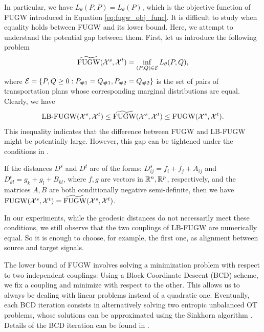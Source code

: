 In particular, we have $L_{\theta}(P, P) = L_{\theta}(P)$,
which is the objective function of FUGW introduced in Equation \eqref{eq:fugw_obj_func}.
It is difficult to study when equality holds between FUGW and its lower bound.
Here, we attempt to understand the potential gap between them.
First, let us introduce the following problem
\begin{equation}
  \widetilde{\text{FUGW}}(\mathcal X^s, \mathcal X^t) = \inf_{(P, Q) \in \mathcal E} L_{\theta}(P, Q),
\end{equation}
where $\mathcal E = \{P, Q \geq 0: P_{\#1} = Q_{\#1}, P_{\#2} = Q_{\#2} \}$ is
the set of pairs of transportation plans whose corresponding marginal distributions are equal.
Clearly, we have
\begin{equation}
    \text{LB-FUGW} (\mathcal X^s, \mathcal X^t) \leq \widetilde{\text{FUGW}}(\mathcal X^s, \mathcal X^t)
    \leq \text{FUGW}(\mathcal X^s, \mathcal X^t).
\end{equation}
This inequality indicates that the difference between FUGW and LB-FUGW might be potentially large.
However, this gap can be tightened under the conditions in .
\begin{corollary} \label{coro:ugw_ucoot}
    If the distances $D^s$ and $D^t$ are of the forms: $D^s_{ij} = f_i + f_j + A_{ij}$ and
    $D^t_{kl} = g_k + g_l + B_{kl}$, where $f, g$ are vectors in $\mathbb R^n, \mathbb R^p$, respectively,
    and the matrices $A, B$ are both conditionally negative semi-definite, then we have
    $\text{FUGW} (\mathcal X^s, \mathcal X^t) = \widetilde{\text{FUGW}}(\mathcal X^s, \mathcal X^t)$.
\end{corollary}
In our experiments, while the geodesic distances do not necessarily meet these conditions,
we still observe that the two couplings of LB-FUGW are numerically equal.
So it is enough to choose, for example, the first one, as alignment between source and target signals.

The lower bound of FUGW involves solving a minimization problem with respect to two independent couplings:
Using a Block-Coordinate Descent (BCD) scheme, we fix a coupling and minimize
with respect to the other. This allows us to always be dealing with linear problems
instead of a quadratic one. Eventually, each BCD iteration consists in alternatively solving
two entropic unbalanced OT problems, whose solutions can be approximated using
the Sinkhorn algorithm \citep{Sejourne19}. Details of the BCD iteration can be found
in .

